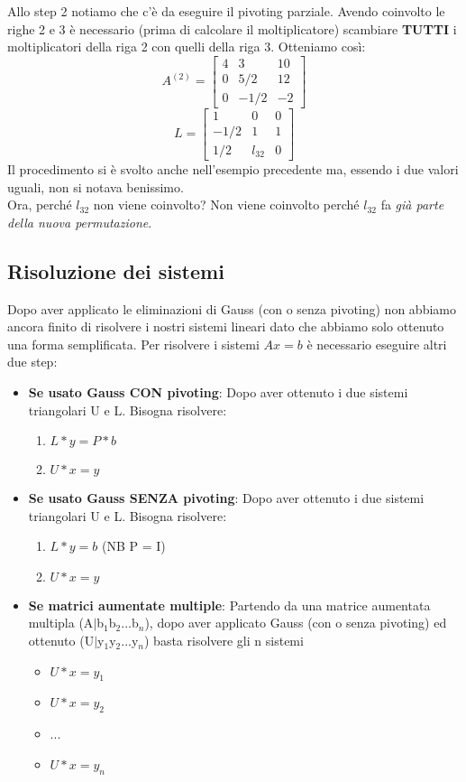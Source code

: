 Allo step 2 notiamo che c'è da eseguire il pivoting parziale. Avendo coinvolto le righe 2 e 3 è necessario (prima di calcolare il moltiplicatore) scambiare \textbf{TUTTI} i moltiplicatori della riga 2 con quelli della riga 3. Otteniamo così: \\

$$ A^{(2)} =
\begin{bmatrix}
4 & 3 & 10 \\
0 & 5/2 & 12 \\
0 & -1/2 & -2 
\end{bmatrix}
$$
\noindent
$$ L =
\begin{bmatrix}
1 & 0 & 0 \\
- 1/2 & 1 & 1 \\
1/2 & l_{32} & 0 
\end{bmatrix}
$$
\noindent
Il procedimento si è svolto anche nell'esempio precedente ma, essendo i due valori uguali, non si notava benissimo. \\
Ora, perché $l_{32}$ non viene coinvolto? Non viene coinvolto perché $l_{32}$ fa \textit{già parte della nuova permutazione}.

\subsection{Risoluzione dei sistemi}
\label{Risoluzione dei sistemi}
Dopo aver applicato le eliminazioni di Gauss (con o senza pivoting) non abbiamo ancora finito di risolvere i nostri sistemi lineari dato che abbiamo solo ottenuto una forma semplificata. Per risolvere i sistemi $Ax = b$ è necessario eseguire altri due step:
\begin{itemize}
\item \textbf{Se usato Gauss CON pivoting}: Dopo aver ottenuto i due sistemi triangolari U e L. Bisogna risolvere:
\begin{enumerate}
\item $L*y = P*b$
\item $U*x = y$
\end{enumerate}
\item \textbf{Se usato Gauss SENZA pivoting}: Dopo aver ottenuto i due sistemi triangolari U e L. Bisogna risolvere:
\begin{enumerate}
\item $L*y = b$ (NB P = I)
\item $U*x = y$
\end{enumerate}
\item \textbf{Se matrici aumentate multiple}: Partendo da una matrice aumentata multipla (A$\mid$b$_1$b$_2$...b$_n$), dopo aver applicato Gauss (con o senza pivoting) ed ottenuto (U$\mid$y$_1$y$_2$...y$_n$) basta risolvere gli n sistemi
\begin{itemize}
\item $U*x = y_1$
\item $U*x = y_2$
\item ...
\item $U*x = y_n$
\end{itemize}
\end{itemize}
\noindent

